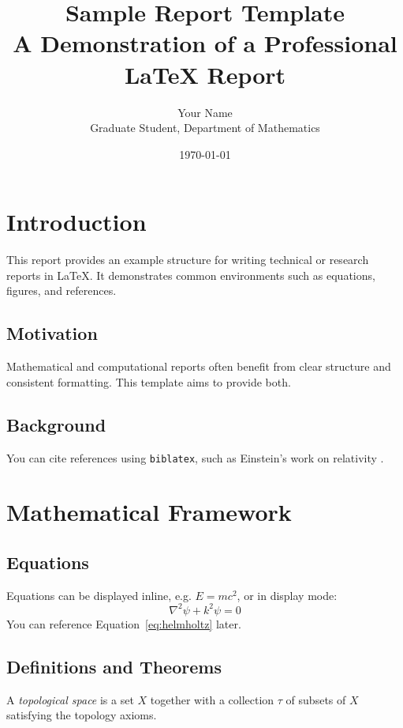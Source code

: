 \documentclass[12pt,a4paper]{report}
\title{%
    \textbf{Sample Report Template}\\[1ex]
    \large A Demonstration of a Professional LaTeX Report
}
\author{Your Name \\ Graduate Student, Department of Mathematics}
\date{\today}
\begin{document}
\maketitle
\tableofcontents
\newpage

\chapter{Introduction}

This report provides an example structure for writing technical or research reports in \LaTeX. It demonstrates common environments such as equations, figures, and references.

\section{Motivation}
Mathematical and computational reports often benefit from clear structure and consistent formatting. This template aims to provide both.

\section{Background}
You can cite references using \texttt{biblatex}, such as Einstein's work on relativity \cite{einstein1905}.

\chapter{Mathematical Framework}

\section{Equations}
Equations can be displayed inline, e.g. \( E = mc^2 \), or in display mode:
\begin{equation}
    \nabla^2 \psi + k^2 \psi = 0
    \label{eq:helmholtz}
\end{equation}
You can reference Equation~\ref{eq:helmholtz} later.

\section{Definitions and Theorems}

\begin{definition}
A \emph{topological space} is a set \( X \) together with a collection \( \tau \) of subsets of \( X \) satisfying the topology axioms.
\end{definition}
\end{document}
